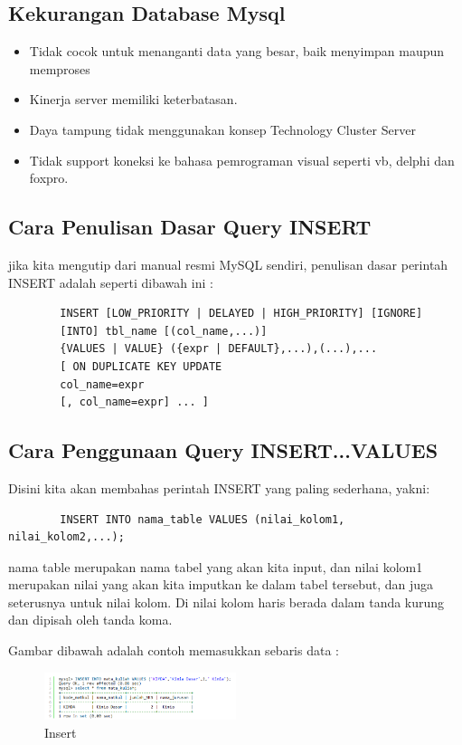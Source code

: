 	\subsection{Kekurangan Database Mysql}
	
	\begin{itemize}
		\item Tidak cocok untuk menanganti data yang besar, baik menyimpan maupun memproses
		\item Kinerja server memiliki keterbatasan.
		\item Daya tampung tidak menggunakan konsep Technology Cluster Server
		\item Tidak support koneksi ke bahasa pemrograman visual seperti vb, delphi dan foxpro.
	\end{itemize}
	
	\subsection{Cara Penulisan Dasar Query INSERT}
	
	jika kita mengutip dari manual resmi MySQL sendiri, penulisan dasar perintah INSERT adalah seperti dibawah ini :
	
	\begin{verbatim}
		INSERT [LOW_PRIORITY | DELAYED | HIGH_PRIORITY] [IGNORE]
		[INTO] tbl_name [(col_name,...)]
		{VALUES | VALUE} ({expr | DEFAULT},...),(...),...
		[ ON DUPLICATE KEY UPDATE
		col_name=expr
		[, col_name=expr] ... ]
	\end{verbatim}
	
	\subsection{Cara Penggunaan Query INSERT...VALUES}
	Disini kita akan membahas perintah INSERT yang paling sederhana, yakni:
	
	\begin{verbatim}
		INSERT INTO nama_table VALUES (nilai_kolom1, nilai_kolom2,...);
	\end{verbatim}
	
	nama table merupakan nama tabel yang akan kita input, dan nilai kolom1 merupakan nilai yang akan kita imputkan ke dalam tabel tersebut, dan juga seterusnya untuk nilai kolom. Di nilai kolom haris berada dalam tanda kurung dan dipisah oleh tanda koma.
	
	Gambar dibawah adalah contoh memasukkan sebaris data :
	
	\begin{figure}[ht]
			\centerline{\includegraphics[width=0.5\textwidth]{figures/insert.png}}
			\caption{Insert}
			\label{insert}
			\end{figure}
			
